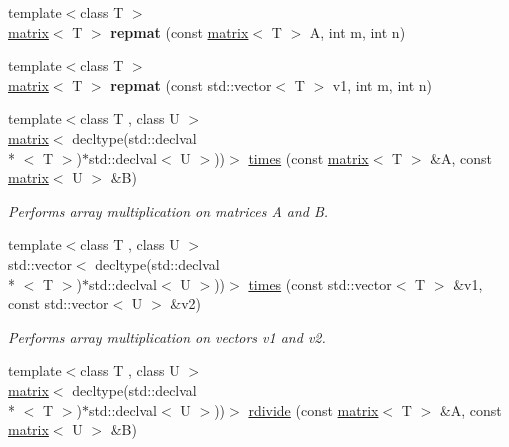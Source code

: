 \begin{DoxyCompactItemize}
\item 
\hypertarget{namespacekeycpp_a40a637f210b03a3901cafbd6c1a7e83f}{{\footnotesize template$<$class T $>$ }\\\hyperlink{classkeycpp_1_1matrix}{matrix}$<$ T $>$ {\bfseries repmat} (const \hyperlink{classkeycpp_1_1matrix}{matrix}$<$ T $>$ A, int m, int n)}\label{namespacekeycpp_a40a637f210b03a3901cafbd6c1a7e83f}

\item 
\hypertarget{namespacekeycpp_a59fbea40dfc2d43cd338812f06c4f064}{{\footnotesize template$<$class T $>$ }\\\hyperlink{classkeycpp_1_1matrix}{matrix}$<$ T $>$ {\bfseries repmat} (const std\-::vector$<$ T $>$ v1, int m, int n)}\label{namespacekeycpp_a59fbea40dfc2d43cd338812f06c4f064}

\item 
{\footnotesize template$<$class T , class U $>$ }\\\hyperlink{classkeycpp_1_1matrix}{matrix}$<$ decltype(std\-::declval\\*
$<$ T $>$)$\ast$std\-::declval$<$ U $>$))$>$ \hyperlink{namespacekeycpp_ac1ff99e34619478096c271b38df1f3d7}{times} (const \hyperlink{classkeycpp_1_1matrix}{matrix}$<$ T $>$ \&A, const \hyperlink{classkeycpp_1_1matrix}{matrix}$<$ U $>$ \&B)
\begin{DoxyCompactList}\small\item\em Performs array multiplication on matrices A and B. \end{DoxyCompactList}\item 
{\footnotesize template$<$class T , class U $>$ }\\std\-::vector$<$ decltype(std\-::declval\\*
$<$ T $>$)$\ast$std\-::declval$<$ U $>$))$>$ \hyperlink{namespacekeycpp_a90d5fd4f9f7c52f16425105995655e9d}{times} (const std\-::vector$<$ T $>$ \&v1, const std\-::vector$<$ U $>$ \&v2)
\begin{DoxyCompactList}\small\item\em Performs array multiplication on vectors v1 and v2. \end{DoxyCompactList}\item 
{\footnotesize template$<$class T , class U $>$ }\\\hyperlink{classkeycpp_1_1matrix}{matrix}$<$ decltype(std\-::declval\\*
$<$ T $>$)$\ast$std\-::declval$<$ U $>$))$>$ \hyperlink{namespacekeycpp_aacd37d195541b2313b753b6e8839f916}{rdivide} (const \hyperlink{classkeycpp_1_1matrix}{matrix}$<$ T $>$ \&A, const \hyperlink{classkeycpp_1_1matrix}{matrix}$<$ U $>$ \&B)

\end{DoxyCompactItemize}
